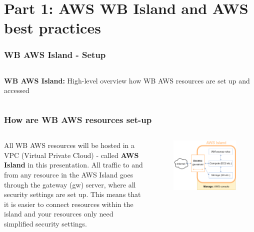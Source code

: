 \documentclass[aspectratio=169]{beamer} %
\begin{document}
\section{Part 1: AWS WB Island and AWS best practices}

\begin{frame}
	\frametitle{WB AWS Island - Setup}
	\begin{columns}[c]
		
		
		\textbf{WB AWS Island:} High-level overview how WB AWS resources
		 are set up and accessed
		
	\end{columns}
\end{frame}

\begin{frame}
\frametitle{How are WB AWS resources set-up}

	\begin{columns}[c]
		\large All WB AWS resources will be hosted in a
		VPC (Virtual Private Cloud) - 
		called \textbf{AWS Island} in this presentation.
		\vspace{.3cm}\newline
		\large All traffic to and from any resource in
		the AWS Island goes through the gateway (gw) server,
		where all security settings are set up.
		\vspace{.3cm}\newline
		\large This means that 
		it is easier to connect resources within the island and
		your resources only need simplified security settings.

		\begin{figure}
			\centering
			\includegraphics[width=\textwidth]{./img/wb-aws.png}
		\end{figure}

	\end{columns}
\end{frame}
\end{document}
